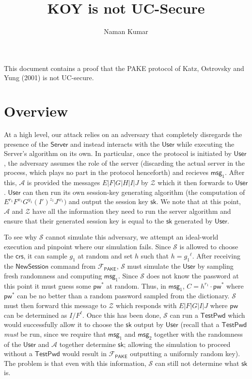 \documentclass[12pt,a4paper]{article}
\title{\textbf{KOY is not UC-Secure}}
\author{Naman Kumar}
\newcommand{\simulator}{\mathcal{S}}
\newcommand{\env}{\mathcal{Z}}
\newcommand{\adv}{\mathcal{A}}
\newcommand{\pake}{\mathcal{F}_{\mathsf{PAKE}}}
\newcommand{\user}{\mathsf{User}}
\newcommand{\sk}{\mathsf{sk}}
\newcommand{\pw}{\mathsf{pw}}
\newcommand{\crs}{\mathsf{crs}}
\newcommand{\newsession}{\mathsf{NewSession}}
\newcommand{\testpwd}{\mathsf{TestPwd}}
\newcommand{\server}{\mathsf{Server}}
\newcommand{\msg}[1]{\mathsf{msg}_{#1}}
\begin{document}
	\maketitle
	
	This document contains a proof that the PAKE protocol of Katz, Ostrovsky and Yung (2001) is not UC-secure.
	
	\section{Overview}
	
	At a high level, our attack relies on an adversary that completely disregards the presence of the $\server$ and instead interacts with the $\user$ while executing the Server's algorithm on its own. In particular, once the protocol is initiated by $\user$, the adversary assumes the role of the server (discarding the actual server in the process, which plays no part in the protocol henceforth) and recieves $\msg{1}$. After this, $\adv$ is provided the messages $E|F|G|H|I|J$ by $\env$ which it then forwards to $\user$. $\user$ can then run its own session-key generating algorithm (the computation of $E^{r_1}F^{x_1}G^{y_1}(I')^{z_1}J^{w_1})$ and output the session key $\sk$. We note that at this point, $\adv$ and $\env$ have all the information they need to run the server algorithm and ensure that their generated session key is equal to the $\sk$ generated by $\user$.
	
	To see why $\simulator$ cannot simulate this adversary, we attempt an ideal-world execution and pinpoint where our simulation fails. Since $\simulator$ is allowed to choose the $\crs$, it can sample $g_1$ at random and set $h$ such that $h={g_1}^{\ell}$. After receiving the $\newsession$ command from $\pake$, $\simulator$ must simulate the $\user$ by sampling fresh randomness and computing $\msg{1}$. Since $\simulator$ does not know the password at this point it must guess some $\pw^{*}$ at random. Thus, in $\msg{1}$, $C=h^{r_1}\cdot\pw^{*}$ where $\pw^{*}$ can be no better than a random password sampled from the dictionary. $\simulator$ must then forward this message to $\env$ which responds with $E|F|G|I|J$ where  $\pw$ can be determined as $I/F^\ell$. Once this has been done, $\simulator$ can run a $\testpwd$ which would successfully allow it to choose the $\sk$ output by $\user$ (recall that a $\testpwd$ \textit{must} be run, since we require that $\msg{1}$ and $\msg{2}$ together with the randomness of the $\user$ and $\adv$ together determine $\sk$; allowing the simulation to proceed without a $\testpwd$ would result in $\pake$ outputting a uniformly random key). The problem is that even with this information, $\simulator$ can still not determine what $\sk$ is.
	
\end{document}

